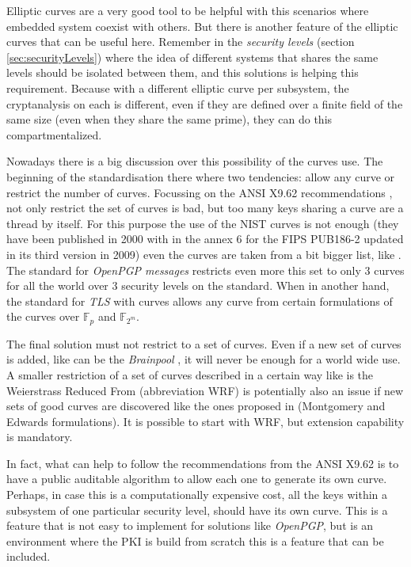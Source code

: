 \documentclass[10pt,a4paper,twoside]{llncs}
\begin{document}
Elliptic curves are a very good tool to be helpful with this scenarios where embedded system coexist with others. But there is another feature of the elliptic curves that can be useful here. Remember in the \emph{security levels} (section \ref{sec:securityLevels}) where the idea of different systems that shares the same levels should be isolated between them, and this solutions is helping this requirement. Because with a different elliptic curve per subsystem, the cryptanalysis on each is different, even if they are defined over  a finite field of the same size (even when they share the same prime), they can do this compartmentalized.

Nowadays there is a big discussion over this possibility of the curves use. The beginning of the standardisation there where two tendencies: allow any curve or restrict the number of curves. Focussing on the ANSI X9.62 recommendations \cite{X9.62-1998}, not only restrict the set of curves is bad, but too many keys sharing a curve are a thread by itself. For this purpose the use of the NIST curves is not enough (they have been published in 2000 with in the annex 6 for the FIPS PUB186-2 updated in its third version \cite{NIST186-3} in 2009) even the curves are taken from a bit bigger list, like \cite{sec2}. The standard for \emph{OpenPGP messages} \cite{rfc6637} restricts even more this set to only 3 curves for all the world over 3 security levels on the standard. When in another hand, the standard for \emph{TLS} with curves \cite{rfc4492} allows any curve from certain formulations of the curves over \ensuremath{\mathbb{F}_{p}} and \ensuremath{\mathbb{F}_{2^m}}.

The final solution must not restrict to a set of curves. Even if a new set of curves is added, like can be the \emph{Brainpool} \cite{brainpool}, it will never be enough for a world wide use. A smaller restriction of a set of curves described in a certain way like is the Weierstrass Reduced From (abbreviation WRF) is potentially also an issue if new sets of good curves are discovered like the ones proposed in \cite{cryptoeprint:2013:647} (Montgomery and Edwards formulations). It is possible to start with WRF, but extension capability is mandatory.

In fact, what can help to follow the recommendations from the ANSI X9.62 is to have a public auditable algorithm to allow each one to generate its own curve. Perhaps, in case this is a computationally expensive cost, all the keys within a subsystem of one particular security level, should have its own curve. This is a feature that is not easy to implement for solutions like \emph{OpenPGP}, but is an environment where the PKI is build from scratch this is a feature that can be included.
\end{document}

